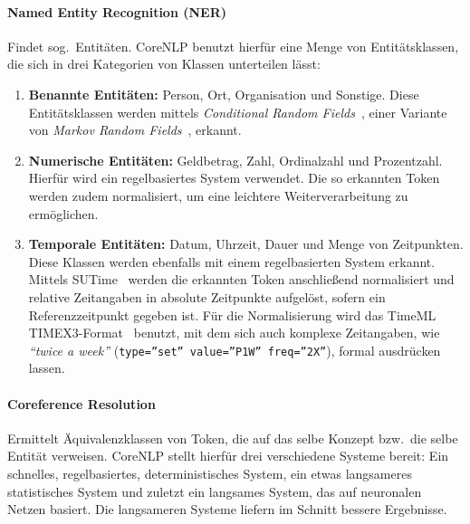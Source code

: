 \paragraph{Named Entity Recognition (NER)}
Findet sog.\ Entitäten.
CoreNLP benutzt hierfür eine Menge von Entitätsklassen, die sich in drei Kategorien von Klassen unterteilen lässt:
\begin{enumerate}
	\item \textbf{Benannte Entitäten:}
		Person, Ort, Organisation und Sonstige.
		Diese Entitätsklassen werden mittels \textit{Conditional Random Fields}~\cite{Finkel2005}, einer Variante von \textit{Markov Random Fields}~, erkannt.
	\item \textbf{Numerische Entitäten:}
		Geldbetrag, Zahl, Ordinalzahl und Prozentzahl.
		Hierfür wird ein regelbasiertes System verwendet.
		Die so erkannten Token werden zudem normalisiert, um eine leichtere Weiterverarbeitung zu ermöglichen.
	\item \textbf{Temporale Entitäten:}
		Datum, Uhrzeit, Dauer und Menge von Zeitpunkten.
		Diese Klassen werden ebenfalls mit einem regelbasierten System erkannt.
		Mittels SUTime~\cite{Chang2012} werden die erkannten Token anschließend normalisiert und relative Zeitangaben in absolute Zeitpunkte aufgelöst, sofern ein Referenzzeitpunkt gegeben ist.
		Für die Normalisierung wird das TimeML TIMEX3-Format~\cite{TIMEX3} benutzt, mit dem sich auch komplexe Zeitangaben, wie \textit{``twice a week''} (\texttt{type=''set'' value=''P1W'' freq=''2X''}), formal ausdrücken lassen.
\end{enumerate}

\paragraph{Coreference Resolution}
Ermittelt Äquivalenzklassen von Token, die auf das selbe Konzept bzw.\ die selbe Entität verweisen.
CoreNLP stellt hierfür drei verschiedene Systeme bereit:
Ein schnelles, regelbasiertes, deterministisches System, ein etwas langsameres statistisches System und zuletzt ein langsames System, das auf neuronalen Netzen basiert.
Die langsameren Systeme liefern im Schnitt bessere Ergebnisse.

